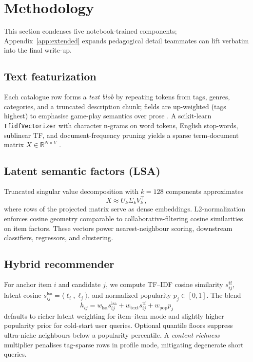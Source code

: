 \section{Methodology}
This section condenses five notebook-trained components; Appendix~\ref{app:extended} expands pedagogical detail teammates can lift verbatim into the final write-up.

\subsection{Text featurization}
Each catalogue row forms a \emph{text blob} by repeating tokens from tags, genres, categories, and a truncated description chunk; fields are up-weighted (tags highest) to emphasise game-play semantics over prose \cite{deerwester1990lsi}. A scikit-learn \texttt{TfidfVectorizer} with character n-grams on word tokens, English stop-words, sublinear TF, and document-frequency pruning yields a sparse term-document matrix \(X\in\mathbb{R}^{N\times V}\) \cite{sklearn2011}.

\subsection{Latent semantic factors (LSA)}
Truncated singular value decomposition with \(k=128\) components approximates
\begin{equation}
X \approx U_k \Sigma_k V_k^\top ,
\end{equation}
where rows of the projected matrix serve as dense embeddings. L2-normalization enforces cosine geometry comparable to collaborative-filtering cosine similarities on item factors. These vectors power nearest-neighbour scoring, downstream classifiers, regressors, and clustering.

\subsection{Hybrid recommender}
For anchor item \(i\) and candidate \(j\), we compute TF--IDF cosine similarity \(s^{\text{tf}}_{ij}\), latent cosine \(s^{\text{lsa}}_{ij}=\langle \ell_i,\ell_j\rangle\), and normalized popularity \(p_j\in[0,1]\). The blend
\begin{equation}
h_{ij}= w_{\text{lsa}} s^{\text{lsa}}_{ij} + w_{\text{text}} s^{\text{tf}}_{ij} + w_{\text{pop}} p_j
\end{equation}
defaults to richer latent weighting for item--item mode and slightly higher popularity prior for cold-start user queries. Optional quantile floors suppress ultra-niche neighbours below a popularity percentile. A \emph{content richness} multiplier penalises tag-sparse rows in profile mode, mitigating degenerate short queries.

